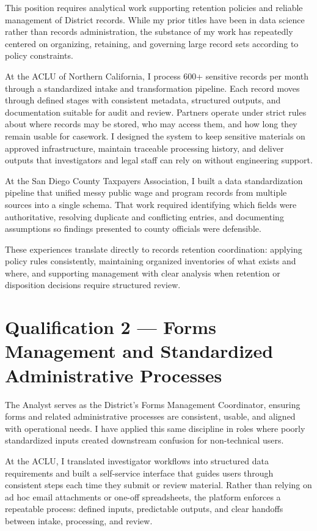 \documentclass[letterpaper,11pt]{article}
\begin{document}
This position requires analytical work supporting retention policies and reliable management of District records.
While my prior titles have been in data science rather than records administration, the substance of my work has
repeatedly centered on organizing, retaining, and governing large record sets according to policy constraints.

At the ACLU of Northern California, I process 600+ sensitive records per month through a standardized intake and
transformation pipeline. Each record moves through defined stages with consistent metadata, structured outputs, and
documentation suitable for audit and review. Partners operate under strict rules about where records may be stored,
who may access them, and how long they remain usable for casework. I designed the system to keep sensitive materials
on approved infrastructure, maintain traceable processing history, and deliver outputs that investigators and legal
staff can rely on without engineering support.

At the San Diego County Taxpayers Association, I built a data standardization pipeline that unified messy public wage
and program records from multiple sources into a single schema. That work required identifying which fields were
authoritative, resolving duplicate and conflicting entries, and documenting assumptions so findings presented to
county officials were defensible.

These experiences translate directly to records retention coordination: applying policy rules consistently,
maintaining organized inventories of what exists and where, and supporting management with clear analysis when
retention or disposition decisions require structured review.

\section{Qualification 2 --- Forms Management and Standardized Administrative Processes}

The Analyst serves as the District's Forms Management Coordinator, ensuring forms and related administrative
processes are consistent, usable, and aligned with operational needs.
I have applied this same discipline in roles where poorly standardized inputs created downstream confusion for
non-technical users.

At the ACLU, I translated investigator workflows into structured data requirements and built a self-service
interface that guides users through consistent steps each time they submit or review material. Rather than relying
on ad hoc email attachments or one-off spreadsheets, the platform enforces a repeatable process: defined inputs,
predictable outputs, and clear handoffs between intake, processing, and review.
\end{document}
